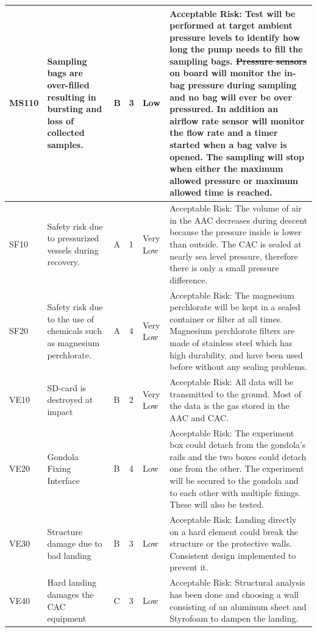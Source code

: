 \documentclass[a4paper,12pt,oneside]{article} %
\providecommand{\DIFaddtex}[1]{{\protect\color{blue}\uwave{#1}}} %
\providecommand{\DIFdeltex}[1]{{\protect\color{red}\sout{#1}}}                      %
\providecommand{\DIFaddbegin}{} %
\providecommand{\DIFaddend}{} %
\providecommand{\DIFdelbegin}{} %
\providecommand{\DIFdelend}{} %
\providecommand{\DIFadd}[1]{\texorpdfstring{\DIFaddtex{#1}}{#1}} %
\providecommand{\DIFdel}[1]{\texorpdfstring{\DIFdeltex{#1}}{}} %
\newcommand{\DIFscaledelfig}{0.5}
\newlength{\DIFdelgraphicswidth} %
\newlength{\DIFdelgraphicsheight} %
\newcommand{\DIFaddincludegraphics}[2][]{{\color{blue}\fbox{\DIFOincludegraphics[#1]{#2}}}} %
\newcommand{\DIFdelincludegraphics}[2][]{%
\sbox{\DIFdelgraphicsbox}{\DIFOincludegraphics[#1]{#2}}%
\settoboxwidth{\DIFdelgraphicswidth}{\DIFdelgraphicsbox} %
\settoboxtotalheight{\DIFdelgraphicsheight}{\DIFdelgraphicsbox} %
\scalebox{\DIFscaledelfig}{%
\parbox[b]{\DIFdelgraphicswidth}{\usebox{\DIFdelgraphicsbox}\\[-\baselineskip] \rule{\DIFdelgraphicswidth}{0em}}\llap{\resizebox{\DIFdelgraphicswidth}{\DIFdelgraphicsheight}{%
\setlength{\unitlength}{\DIFdelgraphicswidth}%
\begin{picture}(1,1)%
\thicklines\linethickness{2pt} %
{\color[rgb]{1,0,0}\put(0,0){\framebox(1,1){}}}%
{\color[rgb]{1,0,0}\put(0,0){\line( 1,1){1}}}%
{\color[rgb]{1,0,0}\put(0,1){\line(1,-1){1}}}%
\end{picture}%
}\hspace*{3pt}}} %
} %
\DeclareRobustCommand{\DIFaddbegin}{\DIFOaddbegin \let\includegraphics\DIFaddincludegraphics} %
\DeclareRobustCommand{\DIFaddend}{\DIFOaddend \let\includegraphics\DIFOincludegraphics} %
\DeclareRobustCommand{\DIFdelbegin}{\DIFOdelbegin \let\includegraphics\DIFdelincludegraphics} %
\DeclareRobustCommand{\DIFdelend}{\DIFOaddend \let\includegraphics\DIFOincludegraphics} %
\begin{document}
\begin{landscape}
\begin{longtable}{|m{}| m{} |m{} |m{}|m{}| m{}|}
MS110 & Sampling bags are over-filled resulting in bursting and loss of collected samples. & B & 3 & \cellcolor[HTML]{FCFF2F}Low & Acceptable Risk: Test will be performed at target ambient pressure levels to identify how long the pump needs to fill the sampling bags. \DIFdelbegin \DIFdel{Pressure sensors }\DIFdelend \DIFaddbegin \DIFadd{A static pressure sensor }\DIFaddend on board will monitor the in-bag pressure during sampling and no bag will ever be over pressured. In addition an airflow rate sensor will monitor the flow rate and a timer started when a bag valve is opened. The sampling will stop when either the maximum allowed pressure or maximum allowed time is reached. \\ \hline
SF10 & Safety risk due to pressurized vessels during recovery. & A & 1 & \cellcolor[HTML]{34FF34}Very Low & Acceptable Risk: The volume of air in the AAC decreases during descent because the pressure inside is lower than outside. The CAC is sealed at nearly sea level pressure, therefore there is only a small pressure difference.  \\ \hline
SF20 & Safety risk due to the use of chemicals such as magnesium perchlorate. & A & 4 & \cellcolor[HTML]{34FF34}Very Low & Acceptable Risk: The magnesium perchlorate will be kept in a sealed container or filter at all times. Magnesium perchlorate filters are made of stainless steel which has high durability, and have been used before without any sealing problems.  \\ \hline
VE10 & SD-card is destroyed at impact & B & 2 & \cellcolor[HTML]{34FF34}Very Low & Acceptable Risk: All data will be transmitted to the ground. Most of the data is the gas stored in the AAC and CAC. \\ \hline
VE20 & Gondola Fixing Interface & B & 4 & \cellcolor[HTML]{FCFF2F}Low & Acceptable Risk: The experiment box could detach from the gondola’s rails and the two boxes could detach one from the other. The experiment will be secured to the gondola and to each other with multiple fixings. These will also be tested. \\ \hline
VE30 & Structure damage due to bad landing & B & 3 & \cellcolor[HTML]{FCFF2F}Low & Acceptable Risk: Landing directly on a hard element could break the structure or the protective walls. Consistent design implemented to prevent it. \\ \hline
VE40 & Hard landing damages the CAC equipment & C & 3 & \cellcolor[HTML]{FCFF2F}Low & Acceptable Risk:  Structural analysis has been done and choosing a wall consisting of an aluminum sheet and Styrofoam to dampen the landing. \\ \hline

\end{longtable}
\end{landscape}
\end{document}

